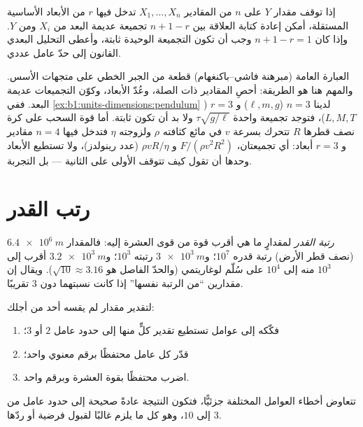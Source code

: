 \begin{proposition}\label{prop:b1:units-dimensions:pi}
إذا توقف مقدار $Y$ على $n$ من المقادير $X_1, \dots, X_n$ تدخل فيها
$r$ من الأبعاد الأساسية المستقلة، أمكن إعادة كتابة العلاقة بين
$n + 1 - r$ تجميعة عديمة البعد من $X_i$ ومن $Y$. وإذا كان
$n + 1 - r = 1$ وجب أن تكون التجميعة الوحيدة ثابتة، وأعطى التحليل
البعدي القانون إلى حدّ عامل عددي.
\end{proposition}
\admitted

\begin{remark}\label{rem:b1:units-dimensions:pi}
العبارة العامة (مبرهنة فاشي--باكنغهام) قطعة من الجبر الخطي على متجهات
الأسس. والمهم هنا هو الطريقة: أحصِ المقادير ذات الصلة، وعُدّ الأبعاد،
وكوّن التجميعات عديمة البعد. ففي
\cref{ex:b1:units-dimensions:pendulum} لدينا $n = 3$
($\ell, m, g$) و $r = 3$ ($L, M, T$)، فتوجد تجميعة واحدة
$\tau\sqrt{g/\ell}$ ولا بد أن تكون ثابتة. أما قوة السحب على كرة نصف
قطرها $R$ تتحرك بسرعة $v$ في مائع كثافته $\rho$ ولزوجته $\eta$ فتدخل
فيها $n = 4$ مقادير و $r = 3$ أبعاد: أي تجميعتان،
$F/(\rho v^2 R^2)$ و $\rho v R/\eta$ (عدد رينولدز)، ولا تستطيع
الأبعاد وحدها أن تقول كيف تتوقف الأولى على الثانية --- بل التجربة.
\end{remark}

\section{رتب القدر}

\begin{definition}\label{def:b1:units-dimensions:oom}
\emph{رتبة القدر} لمقدارٍ ما هي أقرب قوة من قوى العشرة إليه: فالمقدار
$\qty{6.4e6}{m}$ (نصف قطر الأرض) رتبة قدره $10^7$؛ و$\qty{3e3}{m}$ رتبته
$10^3$؛ و$\qty{3.2e3}{m}$ أقرب إلى $10^3$ منه إلى $10^4$ على سُلّم
لوغاريتمي (والحدّ الفاصل هو $\sqrt{10} \approx 3.16$). ويقال إن
مقدارين ``من الرتبة نفسها'' إذا كانت نسبتهما دون $3$ تقريبًا.
\end{definition}

\begin{method}[التقدير]\label{met:b1:units-dimensions:estimate}
لتقدير مقدار لم يقسه أحد من أجلك:
\begin{enumerate}
  \item فكّكه إلى عوامل تستطيع تقدير كلٍّ منها إلى حدود عامل
        $2$ أو $3$؛
  \item قدّر كل عامل محتفظًا برقم معنوي واحد؛
  \item اضرب محتفظًا بقوة العشرة وبرقم واحد.
\end{enumerate}
تتعاوض أخطاء العوامل المختلفة جزئيًّا، فتكون النتيجة عادةً صحيحة إلى
حدود عامل من $3$ إلى $10$، وهو كل ما يلزم غالبًا لقبول فرضية أو
ردّها.
\end{method}

